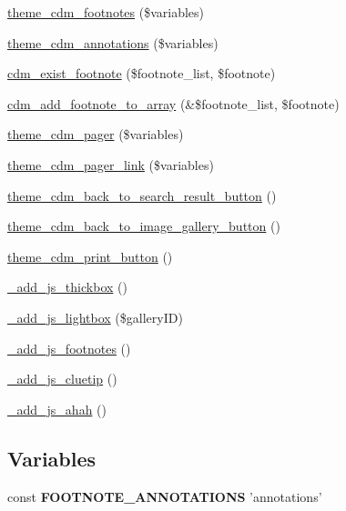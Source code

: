 \begin{DoxyCompactItemize}
\item 
\hyperlink{cdm__dataportal_8common_8theme_aeff79752d4840eb910933e361bb1e565}{theme\-\_\-cdm\-\_\-footnotes} (\$variables)
\item 
\hyperlink{cdm__dataportal_8common_8theme_afa44c06d555fd7bbc27fa34d0639c17a}{theme\-\_\-cdm\-\_\-annotations} (\$variables)
\item 
\hyperlink{cdm__dataportal_8common_8theme_a376153a0e88c3bf99718bd64eb13368c}{cdm\-\_\-exist\-\_\-footnote} (\$footnote\-\_\-list, \$footnote)
\item 
\hyperlink{cdm__dataportal_8common_8theme_a25169077ae083be565d58fdd3c147753}{cdm\-\_\-add\-\_\-footnote\-\_\-to\-\_\-array} (\&\$footnote\-\_\-list, \$footnote)
\item 
\hyperlink{cdm__dataportal_8common_8theme_a003780677a5018d16e388d592befd38c}{theme\-\_\-cdm\-\_\-pager} (\$variables)
\item 
\hyperlink{cdm__dataportal_8common_8theme_a03ac0ee86bffa32415d8caa9a8745a01}{theme\-\_\-cdm\-\_\-pager\-\_\-link} (\$variables)
\item 
\hyperlink{cdm__dataportal_8common_8theme_a35bcfe70942b7d783c6744e6d73502ca}{theme\-\_\-cdm\-\_\-back\-\_\-to\-\_\-search\-\_\-result\-\_\-button} ()
\item 
\hyperlink{cdm__dataportal_8common_8theme_ad30406dae55dde9bc88b90f6f1fb8724}{theme\-\_\-cdm\-\_\-back\-\_\-to\-\_\-image\-\_\-gallery\-\_\-button} ()
\item 
\hyperlink{cdm__dataportal_8common_8theme_aaf93b18d602bfb717cd0c137bf5719f3}{theme\-\_\-cdm\-\_\-print\-\_\-button} ()
\item 
\hyperlink{cdm__dataportal_8common_8theme_a44bd4bed120a76f70557a75763406c0b}{\-\_\-add\-\_\-js\-\_\-thickbox} ()
\item 
\hyperlink{cdm__dataportal_8common_8theme_a2d9bbfd3aed6a8fc1821a68251a55d87}{\-\_\-add\-\_\-js\-\_\-lightbox} (\$gallery\-I\-D)
\item 
\hyperlink{cdm__dataportal_8common_8theme_a98e5df741eb25f449649e8eb4bc4202f}{\-\_\-add\-\_\-js\-\_\-footnotes} ()
\item 
\hyperlink{cdm__dataportal_8common_8theme_ac4d00bb3ce9a8de8c2202026894d257e}{\-\_\-add\-\_\-js\-\_\-cluetip} ()
\item 
\hyperlink{cdm__dataportal_8common_8theme_ab3fe3f702873ddbaf808afa30b18340c}{\-\_\-add\-\_\-js\-\_\-ahah} ()
\end{DoxyCompactItemize}
\subsection*{Variables}
\begin{DoxyCompactItemize}
\item 
\hypertarget{cdm__dataportal_8common_8theme_a1cc47caec9a0ec3713d968a038330865}{const {\bfseries F\-O\-O\-T\-N\-O\-T\-E\-\_\-\-A\-N\-N\-O\-T\-A\-T\-I\-O\-N\-S} 'annotations'}\label{cdm__dataportal_8common_8theme_a1cc47caec9a0ec3713d968a038330865}

\end{DoxyCompactItemize}


